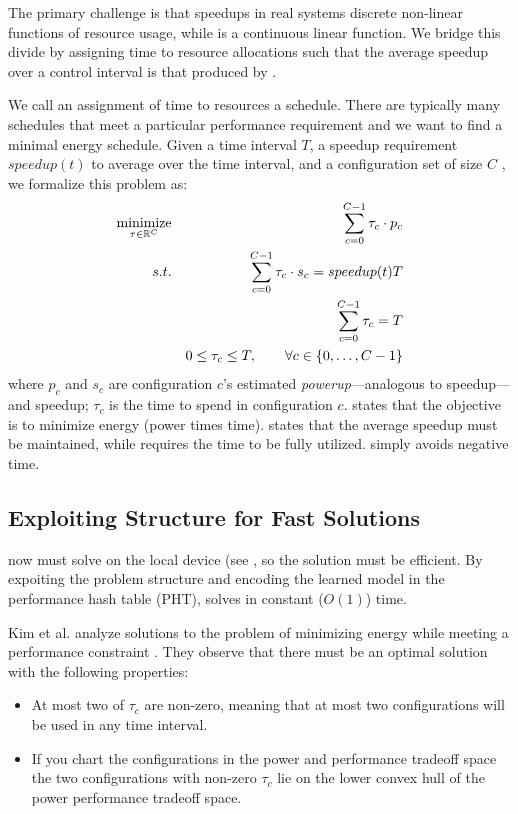 The primary challenge is that speedups in real systems discrete
non-linear functions of resource usage, while 
is a continuous linear function.  We bridge this divide by assigning
time to resource allocations such that the average speedup over a
control interval is that produced by .

We call an assignment of time to resources a schedule. There are
typically many schedules that meet a particular performance
requirement and we want to find a minimal energy schedule. Given a
time interval $T$, a speedup requirement $speedup(t)$ to average over
the time interval, and a configuration set of size $C$ , we formalize
this problem as:
\begin{eqnarray}
  \minimize_{\mathbf{\tau} \in \R^{C}} && \sum_{c=0}^{C-1} \tau_c \cdot p_c \label{eqn:power}  \\
  \st %
  && \sum_{c=0}^{C-1} \tau_c \cdot s_c =  speedup(t)T \label{eqn:work} \\
  && \sum_{c=0}^{C-1} \tau_c =  T \label{eqn:deadline} \\
  && 0 \le \tau_c \le T, \qquad \forall c \in \{0,\ldots,C-1\} \label{eqn:time}
\end{eqnarray}
where $p_c$ and $s_c$ are configuration $c$'s estimated
\emph{powerup}---analogous to speedup---and speedup; $\tau_c$ is the
time to spend in configuration $c$.   states that the
objective is to minimize energy (power times time).  
states that the average speedup must be maintained, while
 requires the time to be fully utilized.
 simply avoids negative time.

\subsection{Exploiting Structure for Fast Solutions}
\SYSTEM{} now must solve  on the local device
(see , so the solution must be efficient.  By
expoiting the problem structure and encoding the learned model in the
performance hash table (PHT), \SYSTEM{} solves 
in constant ($O(1)$) time.

Kim et al. analyze solutions to the problem of minimizing energy while
meeting a performance constraint \cite{kim-cpsna}.  They observe that
there must be an optimal solution with the following properties:
\begin{itemize}
\item At most two of $\tau_c$ are non-zero, meaning that at most two
  configurations will be used in any time interval.
\item If you chart the configurations in the power and performance
  tradeoff space the two configurations with non-zero $\tau_c$ lie on
  the lower convex hull of the power performance tradeoff space.
\end{itemize}

